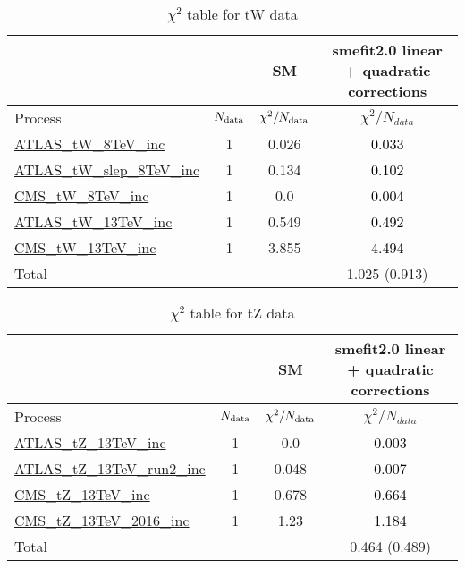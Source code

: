 \documentclass{article}
\begin{document}
\begin{table}[H]
\centering
\begin{tabular}{|l|c|c|c|}
\hline
 \multicolumn{2}{|c|}{} & SM& smefit2.0 linear + quadratic corrections\\ \hline
Process & $N_{\rm data}$ & $\chi^ 2/N_{\rm data}$& $\chi^ 2/N_{data}$\\ \hline
\href{https://arxiv.org/abs/1510.03752}{ATLAS_tW_8TeV_inc} & 1 & 0.026 & \textcolor{black}                            {0.033} \\ \hline
\href{https://arxiv.org/abs/2007.01554}{ATLAS_tW_slep_8TeV_inc} & 1 & 0.134 & \textcolor{black}                            {0.102} \\ \hline
\href{https://arxiv.org/abs/1401.2942}{CMS_tW_8TeV_inc} & 1 & 0.0 & \textcolor{black}                            {0.004} \\ \hline
\href{https://arxiv.org/abs/1612.07231}{ATLAS_tW_13TeV_inc} & 1 & 0.549 & \textcolor{black}                            {0.492} \\ \hline
\href{https://arxiv.org/abs/1805.07399}{CMS_tW_13TeV_inc} & 1 & 3.855 & \textcolor{black}                            {4.494} \\ \hline
\hline Total & &  & 1.025 (0.913) \\ \hline
\end{tabular}
\caption{$\chi^2$ table for tW data}
\end{table}
\begin{table}[H]
\centering
\begin{tabular}{|l|c|c|c|}
\hline
 \multicolumn{2}{|c|}{} & SM& smefit2.0 linear + quadratic corrections\\ \hline
Process & $N_{\rm data}$ & $\chi^ 2/N_{\rm data}$& $\chi^ 2/N_{data}$\\ \hline
\href{https://arxiv.org/abs/1712.02825}{ATLAS_tZ_13TeV_inc} & 1 & 0.0 & \textcolor{black}                            {0.003} \\ \hline
\href{https://arxiv.org/abs/2002.07546}{ATLAS_tZ_13TeV_run2_inc} & 1 & 0.048 & \textcolor{black}                            {0.007} \\ \hline
\href{https://arxiv.org/abs/1712.02825}{CMS_tZ_13TeV_inc} & 1 & 0.678 & \textcolor{black}                            {0.664} \\ \hline
\href{https://arxiv.org/abs/1812.05900}{CMS_tZ_13TeV_2016_inc} & 1 & 1.23 & \textcolor{black}                            {1.184} \\ \hline
\hline Total & &  & 0.464 (0.489) \\ \hline
\end{tabular}
\caption{$\chi^2$ table for tZ data}
\end{table}
\end{document}
